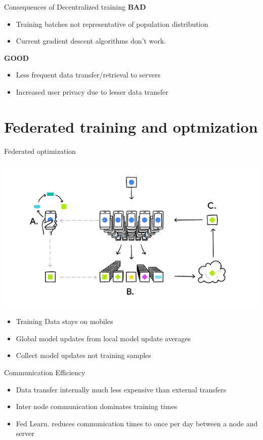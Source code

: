 \documentclass[10pt]{beamer}
\begin{document}
\begin{frame}{Consequences of Decentralized training}
  \textbf{BAD}
  \begin{itemize}
  \item Training batches not representative of population distribution
  \item Current gradient descent algorithms don't work.
  \end{itemize}
  \textbf{GOOD}
  \begin{itemize}
  \item Less frequent data transfer/retrieval to servers
  \item Increased user privacy due to lesser data transfer
  \end{itemize}
\end{frame}
\section{Federated training and optmization}
\begin{frame}{Federated optimization}
  \begin{center}
    \includegraphics[height=0.4\textwidth]{feder.png}
  \end{center}
  \begin{itemize}
  \item Training Data stays on mobiles
  \item Global model updates from local model update averages
  \item Collect model updates not training samples
  \end{itemize}
\end{frame}
\begin{frame}{Communication Efficiency}
  \begin{itemize}
  \item Data transfer internally much less expensive than external transfers
  \item Inter node communication dominates training times
  \item Fed Learn. reduces communication times to once per day between a node
    and server
  \end{itemize}
\end{frame}
\end{document}
